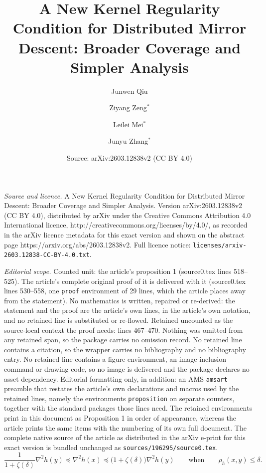 \documentclass[10pt,a4paper]{amsart}
\title{A New Kernel Regularity Condition for Distributed Mirror Descent: Broader Coverage and Simpler Analysis}
\author{Junwen Qiu \and Ziyang Zeng${}^*$ \and Leilei Mei${}^*$ \and Junyu Zhang${}^*$}
\date{Source: arXiv:2603.12838v2 (CC BY 4.0)}
\begin{document}
\maketitle

\noindent\emph{Source and licence.} A New Kernel Regularity Condition for Distributed Mirror Descent: Broader Coverage and Simpler Analysis. Version arXiv:2603.12838v2 (CC BY 4.0), distributed by arXiv under the Creative Commons Attribution 4.0 International licence, http://creativecommons.org/licenses/by/4.0/, as recorded in the arXiv licence metadata for this exact version and shown on the abstract page https://arxiv.org/abs/2603.12838v2. Full licence notice: \texttt{licenses/arxiv-2603.12838-CC-BY-4.0.txt}.\par\smallskip

\noindent\textit{Editorial scope.} Counted unit: the article's proposition 1 (source0.tex lines 518--525). The article's complete original proof of it is delivered with it (source0.tex lines 530--558, one \texttt{proof} environment of 29 lines, which the article places away from the statement). No mathematics is written, repaired or re-derived: the statement and the proof are the article's own lines, in the article's own notation, and no retained line is substituted or re-flowed.  Retained uncounted as the source-local context the proof needs: lines 467--470.  Nothing was omitted from any retained span, so the package carries no omission record.  No retained line contains a citation, so the wrapper carries no bibliography and no bibliography entry.  No retained line contains a figure environment, an image-inclusion command or drawing code, so no image is delivered and the package declares no asset dependency.  Editorial formatting only, in addition: an AMS \texttt{amsart} preamble that restates the article's own declarations and macros used by the retained lines, namely the environments \texttt{proposition} on separate counters, together with the standard packages those lines need.  The retained environments print in this document as Proposition 1 in order of appearance, whereas the article prints the same items with the numbering of its own full document.  The complete native source of the article as distributed in the arXiv e-print for this exact version is bundled unchanged as \texttt{sources/196295/source0.tex}.
\begin{equation}
    \label{eqn:HRUC-Hessian-comparison}
    \frac{1}{1+\zeta(\delta)}\nabla^2h(y)\preceq \nabla^2h(x)\preceq \big(1+\zeta(\delta)\big)\nabla^2h(y)\qquad \text{when}\qquad \rho_h(x,y)\leq\delta.
\end{equation} 
\end{document}
